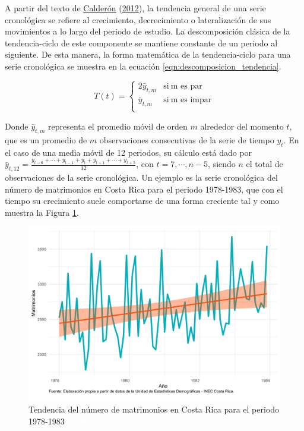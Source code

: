 \documentclass[
]{article}
\begin{document}
A partir del texto de
\protect\hyperlink{ref-calderon2012estadistica}{Calderón}
(\protect\hyperlink{ref-calderon2012estadistica}{2012}), la tendencia
general de una serie cronológica se refiere al crecimiento,
decrecimiento o lateralización de sus movimientos a lo largo del periodo
de estudio. La descomposición clásica de la tendencia-ciclo de este
componente se mantiene constante de un periodo al siguiente. De esta
manera, la forma matemática de la tendencia-ciclo para una serie
cronológica se muestra en la ecuación
\eqref{eqn:descomposicion_tendencia}.

\begin{equation}
\label{eqn:descomposicion_tendencia}
T(t)=
\begin{cases}
2\bar y_{t,m} & \text{si}\ \text{m es par} \\
\bar y_{t, m} & \text{si}\ \text{m es impar} \\
\end{cases}
\end{equation}

Donde \(\bar y_{t,m}\) representa el promedio móvil de orden \(m\)
alrededor del momento \(t\), que es un promedio de \(m\) observaciones
consecutivas de la serie de tiempo \(y_t\). En el caso de una media
móvil de 12 periodos, su cálculo está dado por
\(\bar{y}_{t, 12}=\frac{y_{t-6}+\cdots+y_{t-1}+y_t+y_{t+1}+\cdots+y_{t+5}}{12}\),
con \(t=7,\cdots,n-5\), siendo \(n\) el total de observaciones de la
serie cronológica. Un ejemplo es la serie cronológica del número de
matrimonios en Costa Rica para el periodo 1978-1983, que con el tiempo
su crecimiento suele comportarse de una forma creciente tal y como
muestra la Figura \ref{fig:ejemplo_tendencia}.

\begin{figure}[H]
\includegraphics[width=1\linewidth,height=1\textheight]{Tesis_files/figure-latex/ejemplo_tendencia-1} \caption{Tendencia del número de matrimonios en Costa Rica para el periodo 1978-1983 \textcolor{white}{prueba de aaaaaaaaaaaaaaaaaaaaaaa}}\label{fig:ejemplo_tendencia}
\end{figure}
\end{document}
